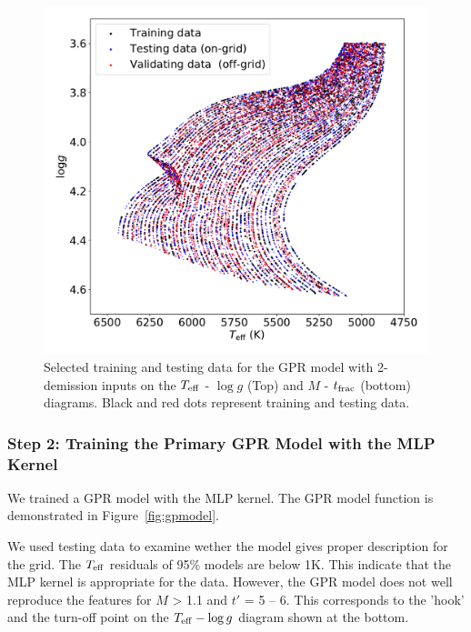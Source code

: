 \begin{figure}
	\includegraphics[width=1.0\columnwidth]{2D_data_on_HR.pdf}
    \caption{Selected training and testing data for the GPR model with 2-demission inputs on the $T_{\rm eff}$ - $\log g$ (Top) and $M$ - $t_{\rm frac}$ (bottom) diagrams. Black and red dots represent training and testing data. }
    \label{fig:data_on_hrd}
\end{figure}

\subsubsection{Step 2: Training the Primary GPR Model with the MLP Kernel}

We trained a GPR model with the MLP kernel. The GPR model function is demonstrated in Figure~\ref{fig:gpmodel}. 

We used testing data to examine wether the model gives proper description for the grid.  
The $T_{\rm eff} $ residuals of 95\% models are below 1K. This indicate that the MLP kernel is appropriate for the data. However, the GPR model does not well reproduce the features for $M$ > 1.1 and $t'$ = 5 -- 6.  This corresponds to the 'hook' and the turn-off point on the  $T_{\rm eff} - \log g$ diagram shown at the bottom. 

